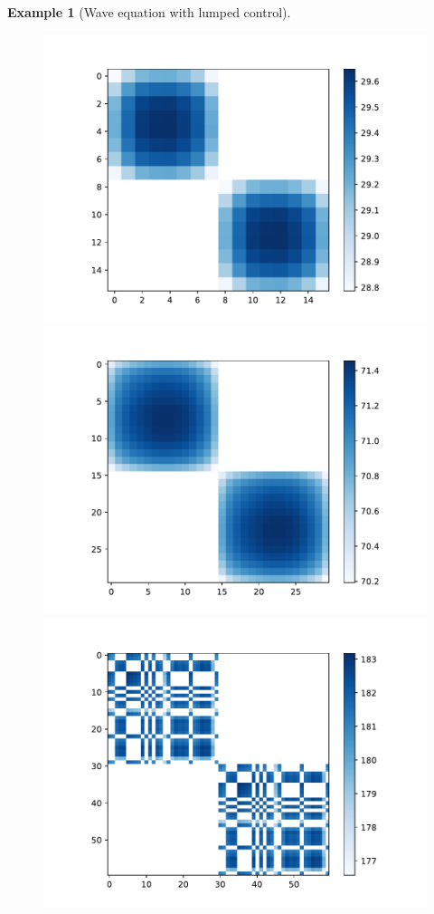 \documentclass[journal,twoside,web]{ieeecolor}
\newtheorem{example}{Example}
\begin{document}
\begin{example}[Wave equation with lumped control]
\begin{figure}
	\includegraphics[scale=0.225]{figures/wave_mat-8d}
	\hspace{0.1cm}
	\includegraphics[scale=0.225]{figures/wave_mat-15d}
	\hspace{0.1cm}
	\includegraphics[scale=0.225]{figures/wave_mat-30d}

\end{figure}
\end{example}
\end{document}
